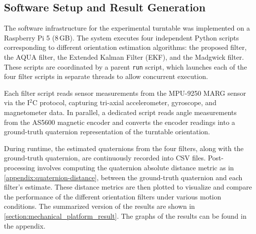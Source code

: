 \documentclass{iutbscthesis}
\begin{document}
\subsection{Software Setup and Result Generation}

The software infrastructure for the experimental turntable was implemented on a Raspberry Pi 5 (8\,GB). The system executes four independent Python scripts corresponding to different orientation estimation algorithms: the proposed filter, the AQUA filter, the Extended Kalman Filter (EKF), and the Madgwick filter. These scripts are coordinated by a parent \texttt{run} script, which launches each of the four filter scripts in separate threads to allow concurrent execution.

Each filter script reads sensor measurements from the MPU-9250 MARG sensor via the I$^2$C protocol, capturing tri-axial accelerometer, gyroscope, and magnetometer data. In parallel, a dedicated script reads angle measurements from the AS5600 magnetic encoder and converts the encoder readings into a ground-truth quaternion representation of the turntable orientation.

During runtime, the estimated quaternions from the four filters, along with the ground-truth quaternion, are continuously recorded into CSV files. Post-processing involves computing the quaternion absolute distance metric as in \autoref{appendix:quaternion-distance}, between the ground-truth quaternion and each filter's estimate. These distance metrics are then plotted to visualize and compare the performance of the different orientation filters under various motion conditions. The summarized version
of the results are shown in \autoref{section:mechanical_platform_result}. The graphs of the results can be found in the appendix. 
\end{document}

